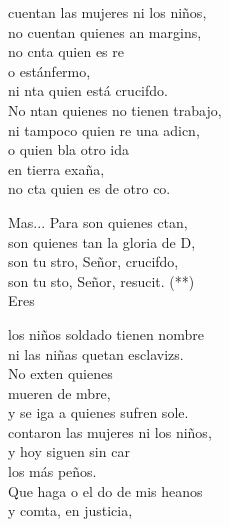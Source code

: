 \begin{cancion}%
	cuentan las mujeres ni los niños,\\
	no cuentan quienes an margins,\\
	no cnta quien es re \\
	o estánfermo,\\
	ni nta quien está crucifdo.\\
	\jump
	No ntan quienes no tienen trabajo,\\
	ni tampoco quien re una adicn, \\
	o quien bla otro ida \\
	en tierra exaña,\\
	no cta quien es de otro co.\jump\\
	\begin{chorus}%
		Mas... Para  son quienes ctan,\\
		son quienes tan la gloria de D,\\
		son tu stro, Señor, crucifdo,\\
		son tu sto, Señor, resucit. (**)\\
		Eres  \jump\\
	\end{chorus}%
	los niños soldado tienen nombre\\
	ni las niñas quetan esclavizs.\\
	No exten quienes \\
	 mueren de mbre,\\
	y se iga a quienes sufren sole.\\
	\jump
	contaron las mujeres ni los niños,\\
	y hoy siguen sin car \\
	los más peños.\\
	Que haga o el do de mis heanos \\
	y comta, en justicia, \\

\end{cancion}
